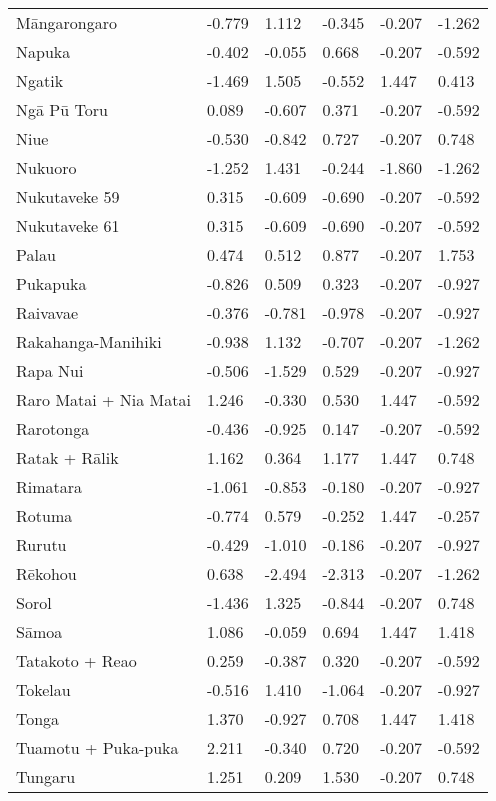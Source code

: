 \begin{longtable}{p{4.5cm}p{2cm}p{2cm}p{2cm}p{4cm}p{4cm}}
  Māngarongaro & -0.779 & 1.112 & -0.345 & -0.207 & -1.262 \\ 
  Napuka & -0.402 & -0.055 & 0.668 & -0.207 & -0.592 \\ 
  Ngatik & -1.469 & 1.505 & -0.552 & 1.447 & 0.413 \\ 
  Ngā Pū Toru & 0.089 & -0.607 & 0.371 & -0.207 & -0.592 \\ 
  Niue & -0.530 & -0.842 & 0.727 & -0.207 & 0.748 \\ 
  Nukuoro & -1.252 & 1.431 & -0.244 & -1.860 & -1.262 \\ 
  Nukutaveke 59 & 0.315 & -0.609 & -0.690 & -0.207 & -0.592 \\ 
  Nukutaveke 61 & 0.315 & -0.609 & -0.690 & -0.207 & -0.592 \\ 
  Palau & 0.474 & 0.512 & 0.877 & -0.207 & 1.753 \\ 
  Pukapuka & -0.826 & 0.509 & 0.323 & -0.207 & -0.927 \\ 
  Raivavae & -0.376 & -0.781 & -0.978 & -0.207 & -0.927 \\ 
  Rakahanga-Manihiki & -0.938 & 1.132 & -0.707 & -0.207 & -1.262 \\ 
  Rapa Nui & -0.506 & -1.529 & 0.529 & -0.207 & -0.927 \\ 
  Raro Matai + Nia Matai & 1.246 & -0.330 & 0.530 & 1.447 & -0.592 \\ 
  Rarotonga & -0.436 & -0.925 & 0.147 & -0.207 & -0.592 \\ 
  Ratak + Rālik & 1.162 & 0.364 & 1.177 & 1.447 & 0.748 \\ 
  Rimatara & -1.061 & -0.853 & -0.180 & -0.207 & -0.927 \\ 
  Rotuma & -0.774 & 0.579 & -0.252 & 1.447 & -0.257 \\ 
  Rurutu & -0.429 & -1.010 & -0.186 & -0.207 & -0.927 \\ 
  Rēkohou & 0.638 & -2.494 & -2.313 & -0.207 & -1.262 \\ 
  Sorol & -1.436 & 1.325 & -0.844 & -0.207 & 0.748 \\ 
  Sāmoa & 1.086 & -0.059 & 0.694 & 1.447 & 1.418 \\ 
  Tatakoto + Reao & 0.259 & -0.387 & 0.320 & -0.207 & -0.592 \\ 
  Tokelau & -0.516 & 1.410 & -1.064 & -0.207 & -0.927 \\ 
  Tonga & 1.370 & -0.927 & 0.708 & 1.447 & 1.418 \\ 
  Tuamotu + Puka-puka & 2.211 & -0.340 & 0.720 & -0.207 & -0.592 \\ 
  Tungaru & 1.251 & 0.209 & 1.530 & -0.207 & 0.748 \\ 

\end{longtable}
